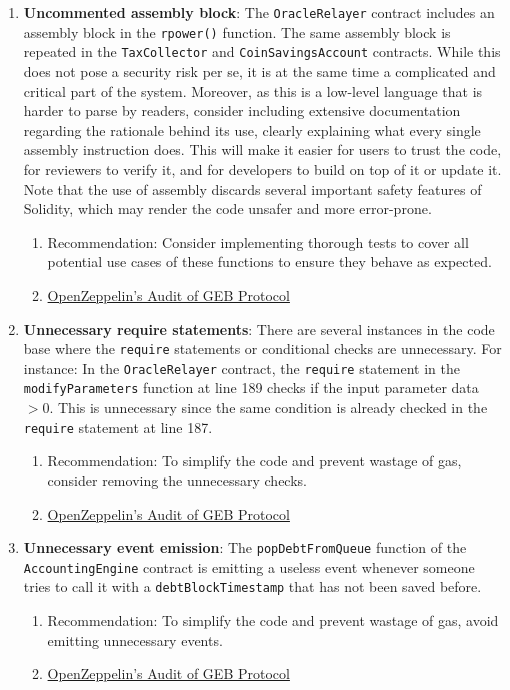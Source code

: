 \begin{enumerate}
\item\textbf{Uncommented assembly block}: The \verb|OracleRelayer| contract includes an assembly block in the \verb|rpower()| function. The same assembly block is repeated in the \verb|TaxCollector| and \verb|CoinSavingsAccount| contracts. While this does not pose a security risk per se, it is at the same time a complicated and critical part of the system. Moreover, as this is a low-level language that is harder to parse by readers, consider including extensive documentation regarding the rationale behind its use, clearly explaining what every single assembly instruction does. This will make it easier for users to trust the code, for reviewers to verify it, and for developers to build on top of it or update it. Note that the use of assembly discards several important safety features of Solidity, which may render the code unsafer and more error-prone.
	\begin{enumerate}
	\item Recommendation: Consider implementing thorough tests to cover all potential use cases of these functions to ensure they behave as expected.
	\item\href{https://blog.openzeppelin.com/geb-protocol-audit/}{OpenZeppelin's Audit of GEB Protocol}
	\end{enumerate}

\item\textbf{Unnecessary require statements}: There are several instances in the code base where the \verb|require| statements or conditional checks are unnecessary. For instance: In the \verb|OracleRelayer| contract, the \verb|require| statement in the \verb|modifyParameters| function at line 189 checks if the input parameter data $> 0$. This is unnecessary since the same condition is already checked in the \verb|require| statement at line 187.
	\begin{enumerate}
	\item Recommendation: To simplify the code and prevent wastage of gas, consider removing the unnecessary checks.
	\item\href{https://blog.openzeppelin.com/geb-protocol-audit/}{OpenZeppelin's Audit of GEB Protocol}
	\end{enumerate}

\item\textbf{Unnecessary event emission}: The \verb|popDebtFromQueue| function of the \verb|AccountingEngine| contract is emitting a useless event whenever someone tries to call it with a \verb|debtBlockTimestamp| that has not been saved before.
	\begin{enumerate}
	\item Recommendation: To simplify the code and prevent wastage of gas, avoid emitting unnecessary events.
	\item\href{https://blog.openzeppelin.com/geb-protocol-audit/}{OpenZeppelin's Audit of GEB Protocol}
	\end{enumerate}


\end{enumerate}

